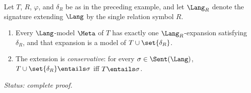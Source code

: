 \begin{theorem}
\label{thm:definitional-conservativity}
Let \(T\), \(R\), \(\varphi\), and \(\delta_R\) be as in the preceding
example, and let \(\Lang_R\) denote the signature extending \(\Lang\) by
the single relation symbol \(R\).
\begin{enumerate}
  \item Every \(\Lang\)-model \(\Meta\) of \(T\) has exactly one
        \(\Lang_R\)-expansion satisfying \(\delta_R\), and that expansion
        is a model of \(T\cup\set{\delta_R}\).
  \item The extension is \emph{conservative}: for every
        \(\sigma\in\Sent(\Lang)\),
        \(T\cup\set{\delta_R}\entails\sigma\) iff
        \(T\entails\sigma\).
\end{enumerate}
\textit{Status: complete proof.}
\end{theorem}
